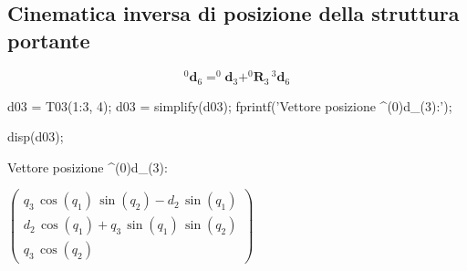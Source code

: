 \documentclass[11pt, a4paper]{article}
\begin{document}
\subsection*{Cinematica inversa di posizione della struttura portante}

\begin{par}
$$^0 {\mathbf{d}}_6 =^0 {\mathbf{d}}_3 +^0 {\mathbf{R}}_3 {\,}^3 {\mathbf{d}}_6$$
\end{par}

\begin{matlabcode}
d03 = T03(1:3, 4);
d03 = simplify(d03);
fprintf('Vettore posizione ^(0)d_(3):\n');

disp(d03);
\end{matlabcode}
\begin{matlaboutput}
Vettore posizione ^(0)d_(3):
\end{matlaboutput}
\begin{matlabsymbolicoutput}
$\displaystyle \left(\begin{array}{c}
q_3 \,\cos \left(q_1 \right)\,\sin \left(q_2 \right)-d_2 \,\sin \left(q_1 \right)\\
d_2 \,\cos \left(q_1 \right)+q_3 \,\sin \left(q_1 \right)\,\sin \left(q_2 \right)\\
q_3 \,\cos \left(q_2 \right)
\end{array}\right)$
\end{matlabsymbolicoutput}
\end{document}
